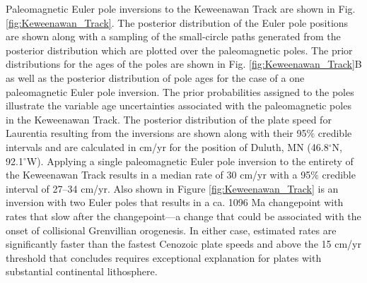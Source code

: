 \documentclass[11pt,letterpaper]{article}
\begin{document}
Paleomagnetic Euler pole inversions to the Keweenawan Track are shown in Fig. \ref{fig:Keweenawan_Track}. The posterior distribution of the Euler pole positions are shown along with a sampling of the small-circle paths generated from the posterior distribution which are plotted over the paleomagnetic poles. The prior distributions for the ages of the poles are shown in Fig. \ref{fig:Keweenawan_Track}B as well as the posterior distribution of pole ages for the case of a one paleomagnetic Euler pole inversion. The prior probabilities assigned to the poles illustrate the variable age uncertainties associated with the paleomagnetic poles in the Keweenawan Track. The posterior distribution of the plate speed for Laurentia resulting from the inversions are shown along with their 95$\%$ credible intervals and are calculated in cm/yr for the position of Duluth, MN (46.8$^\circ$N, 92.1$^\circ$W). Applying a single paleomagnetic Euler pole inversion to the entirety of the Keweenawan Track results in a median rate of 30 cm/yr with a 95$\%$ credible interval of 27–34 cm/yr. Also shown in Figure \ref{fig:Keweenawan_Track} is an inversion with two Euler poles that results in a ca. 1096 Ma changepoint with rates that slow after the changepoint---a change that could be associated with the onset of collisional Grenvillian orogenesis. In either case, estimated rates are significantly faster than the fastest Cenozoic plate speeds and above the 15 cm/yr threshold that \cite{Zahirovic2015a} concludes requires exceptional explanation for plates with substantial continental lithosphere.
\end{document}
